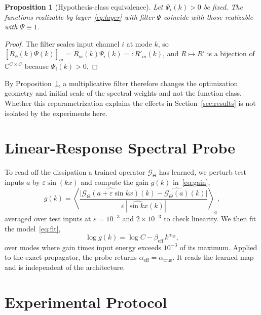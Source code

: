 \documentclass[conference]{IEEEtran}
\newtheorem{proposition}{Proposition}
\begin{document}
\begin{proposition}[Hypothesis-class equivalence]\label{prop:absorb}
Let $\Psi_i(k)>0$ be fixed. The functions realizable by layer~\eqref{eq:layer} with filter $\Psi$ coincide with those realizable with $\Psi\equiv1$.
\end{proposition}
\begin{proof}
The filter scales input channel $i$ at mode $k$, so $[R_\phi(k)\Psi(k)]_{oi}=R_{oi}(k)\Psi_i(k)=:R'_{oi}(k)$, and $R\mapsto R'$ is a bijection of $\mathbb{C}^{C\times C}$ because $\Psi_i(k)>0$.
\end{proof}
By Proposition~\ref{prop:absorb}, a multiplicative filter therefore changes the optimization geometry and initial scale of the spectral weights and not the function class. Whether this reparametrization explains the effects in Section~\ref{sec:results} is not isolated by the experiments here.

\section{Linear-Response Spectral Probe}
To read off the dissipation a trained operator $\mathcal{G}_\Theta$ has learned, we perturb test inputs $a$ by $\varepsilon\sin(kx)$ and compute the gain $g(k)$ in~\eqref{eq:gain},
\begin{equation}
g(k)=\left\langle\frac{\bigl|\widehat{\mathcal{G}_\Theta(a+\varepsilon\sin kx)}(k)-\widehat{\mathcal{G}_\Theta(a)}(k)\bigr|}{\varepsilon\,|\widehat{\sin kx}(k)|}\right\rangle_{a},
\label{eq:gain}
\end{equation}
averaged over test inputs at $\varepsilon=10^{-3}$ and $2\times10^{-3}$ to check linearity. We then fit the model~\eqref{eq:fit},
\begin{equation}
\log g(k)=\log C-\beta_{\mathrm{eff}}\,k^{\alpha_{\mathrm{eff}}},
\label{eq:fit}
\end{equation}
over modes where gain times input energy exceeds $10^{-3}$ of its maximum. Applied to the exact propagator, the probe returns $\alpha_{\mathrm{eff}}=\alpha_{\mathrm{true}}$. It reads the learned map and is independent of the architecture.

\section{Experimental Protocol}
\end{document}
